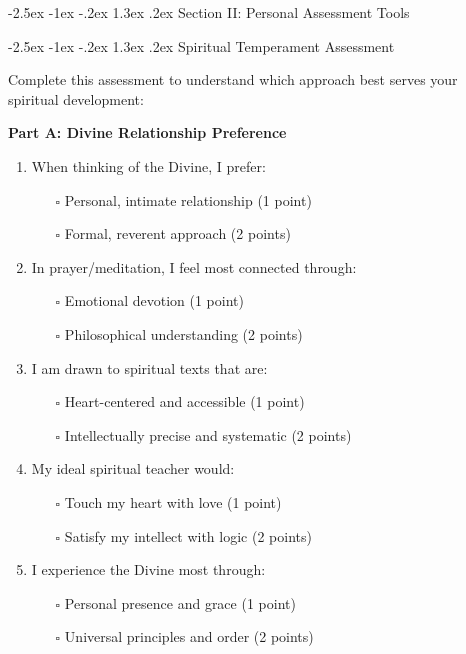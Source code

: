 \documentclass[12pt,twoside]{book}
\makeatletter
\renewcommand\section{\@startsection{section}{1}{\z@}%
{-2.5ex \@plus -1ex \@minus -.2ex}%
{1.3ex \@plus.2ex}%
{\normalfont\Large\bfseries}}
\makeatother
\begin{document}
\section{Section II: Personal Assessment Tools}
\label{sec:orgd2c1fae}

\section{Spiritual Temperament Assessment}
\label{sec:orgf2b6a7f}

Complete this assessment to understand which approach best serves your spiritual development:

\textbf{\textbf{Part A: Divine Relationship Preference}}

\begin{enumerate}
\item When thinking of the Divine, I prefer:
\begin{itemize}
\item[{$\square$}] Personal, intimate relationship (1 point)
\item[{$\square$}] Formal, reverent approach (2 points)
\end{itemize}

\item In prayer/meditation, I feel most connected through:
\begin{itemize}
\item[{$\square$}] Emotional devotion (1 point)
\item[{$\square$}] Philosophical understanding (2 points)
\end{itemize}

\item I am drawn to spiritual texts that are:
\begin{itemize}
\item[{$\square$}] Heart-centered and accessible (1 point)
\item[{$\square$}] Intellectually precise and systematic (2 points)
\end{itemize}

\item My ideal spiritual teacher would:
\begin{itemize}
\item[{$\square$}] Touch my heart with love (1 point)
\item[{$\square$}] Satisfy my intellect with logic (2 points)
\end{itemize}

\item I experience the Divine most through:
\begin{itemize}
\item[{$\square$}] Personal presence and grace (1 point)
\item[{$\square$}] Universal principles and order (2 points)
\end{itemize}
\end{enumerate}
\end{document}
